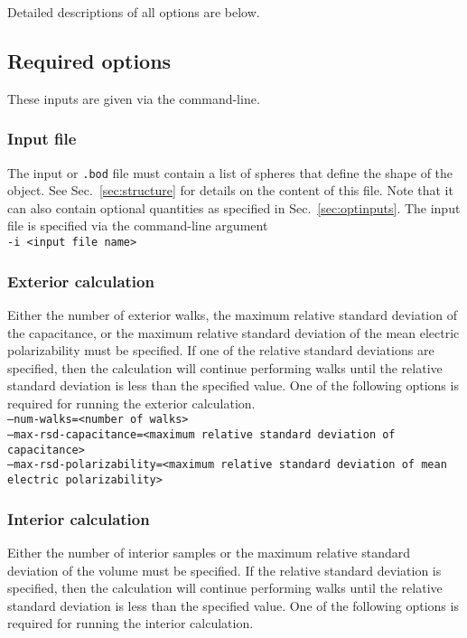 \documentclass[12pt,letterpaper]{article}
\begin{document}
\noindent Detailed descriptions of all options are below.

\subsection{Required options}
These inputs are given via the command-line. 

\subsubsection{Input file}
The input or \texttt{.bod} file must contain a list of spheres that define the shape of the object. See Sec.~\ref{sec:structure} for details on the content of this file. Note that it can also contain optional quantities as specified in Sec.~\ref{sec:optinputs}. The input file is specified via the command-line argument\\ 

\texttt{-i <input file name>}

\subsubsection{Exterior calculation}
Either the number of exterior walks, the maximum relative standard deviation of the capacitance, or the maximum relative standard deviation of the mean electric polarizability must be specified. If one of the relative standard deviations are specified, then the calculation will continue performing walks until the relative standard deviation is less than the specified value. One of the following options is required for running the exterior calculation. \\

\indent \texttt{--num-walks=<number of walks>} \\
\indent \texttt{--max-rsd-capacitance=<maximum relative standard deviation of capacitance>} \\
\indent \texttt{--max-rsd-polarizability=<maximum relative standard deviation of mean electric polarizability>}

\subsubsection{Interior calculation}
Either the number of interior samples or the maximum relative standard deviation of the volume must be specified. If the relative standard deviation is specified, then the calculation will continue performing walks until the relative standard deviation is less than the specified value. One of the following options is required for running the interior calculation.  \\
\end{document}
